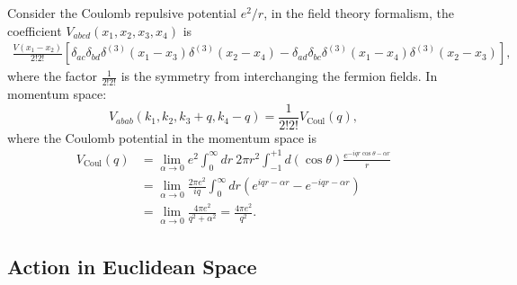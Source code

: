 \documentclass[aps,prb,superscriptaddress,nofootinbib]{revtex4}
\begin{document}
Consider the Coulomb repulsive potential $e^2/r$, in the field theory formalism, the coefficient $V_{abcd}(x_1,x_2,x_3,x_4)$ is
\begin{equation}
\begin{aligned}
	\frac{V(x_1-x_2)}{2!2!}\left[\delta_{ac}\delta_{bd}\delta^{(3)}(x_1-x_3)\delta^{(3)}(x_2-x_4) - \delta_{ad}\delta_{bc}\delta^{(3)}(x_1-x_4)\delta^{(3)}(x_2-x_3)\right],
\end{aligned}
\end{equation}
where the factor $\frac{1}{2!2!}$ is the symmetry from interchanging the fermion fields.
In momentum space:
\begin{equation}
	V_{abab}(k_1,k_2,k_3+q,k_4-q) = \frac{1}{2!2!} V_{\mathrm{Coul}}(q),
\end{equation}
where the Coulomb potential in the momentum space is
\begin{equation}
\begin{aligned}
	V_{\mathrm{Coul}}(q) 
	&=  \lim_{\alpha\rightarrow0}e^{2}\int_{0}^{\infty}dr\ 2\pi r^{2} \int_{-1}^{+1}d\left(\cos\theta\right)\frac{e^{-iqr\cos\theta-\alpha r}}{r} \\
	&=  \lim_{\alpha\rightarrow0}\frac{2\pi e^{2}}{iq}\int_{0}^{\infty}dr\left(e^{iqr-\alpha r}-e^{-iqr-\alpha r}\right)\\
 	&=  \lim_{\alpha\rightarrow0}\frac{4\pi e^{2}}{q^{2}+\alpha^{2}}
	=  \frac{4\pi e^{2}}{q^{2}}.
\end{aligned}
\end{equation}



\subsection{Action in Euclidean Space}
\end{document}
